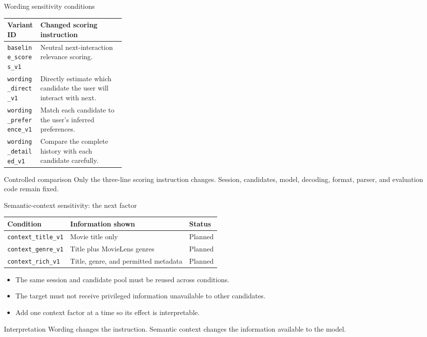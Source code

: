 \documentclass[aspectratio=169,12pt]{beamer}
\newcommand{\code}[1]{\texttt{\footnotesize #1}}
\begin{document}
\begin{frame}{Wording sensitivity conditions}
\begin{table}
\centering
\scriptsize
\begin{tabularx}{\linewidth}{@{}p{0.28\linewidth}X@{}}
\toprule
\textbf{Variant ID} & \textbf{Changed scoring instruction}\\
\midrule
\code{baseline\_scores\_v1} &
Neutral next-interaction relevance scoring.\\
\code{wording\_direct\_v1} &
Directly estimate which candidate the user will interact with next.\\
\code{wording\_preference\_v1} &
Match each candidate to the user's inferred preferences.\\
\code{wording\_detailed\_v1} &
Compare the complete history with each candidate carefully.\\
\bottomrule
\end{tabularx}
\end{table}

\vspace{0.5em}
\begin{alertblock}{Controlled comparison}
Only the three-line scoring instruction changes. Session, candidates, model,
decoding, format, parser, and evaluation code remain fixed.
\end{alertblock}
\end{frame}

\begin{frame}{Semantic-context sensitivity: the next factor}
\begin{table}
\centering
\small
\begin{tabular}{lll}
\toprule
\textbf{Condition} & \textbf{Information shown} & \textbf{Status}\\
\midrule
\code{context\_title\_v1} & Movie title only & Planned\\
\code{context\_genre\_v1} & Title plus MovieLens genres & Planned\\
\code{context\_rich\_v1} & Title, genre, and permitted metadata & Planned\\
\bottomrule
\end{tabular}
\end{table}

\begin{itemize}
  \item The same session and candidate pool must be reused across conditions.
  \item The target must not receive privileged information unavailable to other
        candidates.
  \item Add one context factor at a time so its effect is interpretable.
\end{itemize}

\begin{exampleblock}{Interpretation}
Wording changes the instruction. Semantic context changes the information
available to the model.
\end{exampleblock}
\end{frame}
\end{document}
